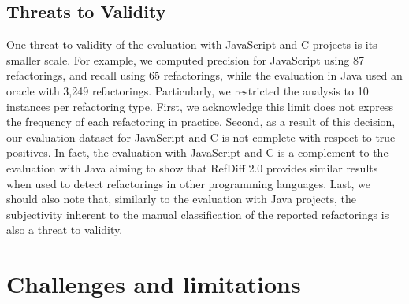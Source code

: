\subsection{Threats to Validity}
\label{SecThreatsJsC}

One threat to validity of the evaluation with JavaScript and C projects is its smaller scale.
For example, we computed precision for JavaScript using 87 refactorings, and  recall using 65 refactorings, while the evaluation in Java used an oracle with 3,249 refactorings.
Particularly, we restricted the analysis to 10 instances per refactoring type. First, we acknowledge this limit does not express the frequency of each refactoring in practice.  Second, as a result of this decision, our evaluation dataset for JavaScript and C is not complete with respect to true positives.
In fact, the evaluation with JavaScript and C is a complement to the evaluation with Java aiming to show that RefDiff 2.0 provides similar results when used to detect refactorings in other programming languages.
Last, we should also note that, similarly to the evaluation with Java projects, the subjectivity inherent to the manual classification of the reported refactorings is also a threat to validity.






\section{Challenges and limitations}


